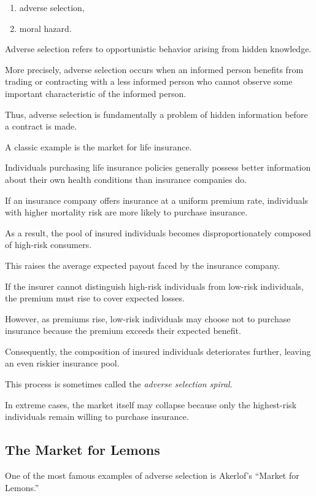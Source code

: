 \begin{enumerate}
    \item adverse selection,
    \item moral hazard.
\end{enumerate}

Adverse selection refers to opportunistic behavior arising from hidden knowledge.

More precisely, adverse selection occurs when an informed person benefits from trading or contracting with a less informed person who cannot observe some important characteristic of the informed person.

Thus, adverse selection is fundamentally a problem of hidden information before a contract is made.

A classic example is the market for life insurance.

Individuals purchasing life insurance policies generally possess better information about their own health conditions than insurance companies do.

If an insurance company offers insurance at a uniform premium rate, individuals with higher mortality risk are more likely to purchase insurance.

As a result, the pool of insured individuals becomes disproportionately composed of high-risk consumers.

This raises the average expected payout faced by the insurance company.

If the insurer cannot distinguish high-risk individuals from low-risk individuals, the premium must rise to cover expected losses.

However, as premiums rise, low-risk individuals may choose not to purchase insurance because the premium exceeds their expected benefit.

Consequently, the composition of insured individuals deteriorates further, leaving an even riskier insurance pool.

This process is sometimes called the \emph{adverse selection spiral}.

In extreme cases, the market itself may collapse because only the highest-risk individuals remain willing to purchase insurance.

\subsection{The Market for Lemons}

One of the most famous examples of adverse selection is Akerlof's ``Market for Lemons.''

